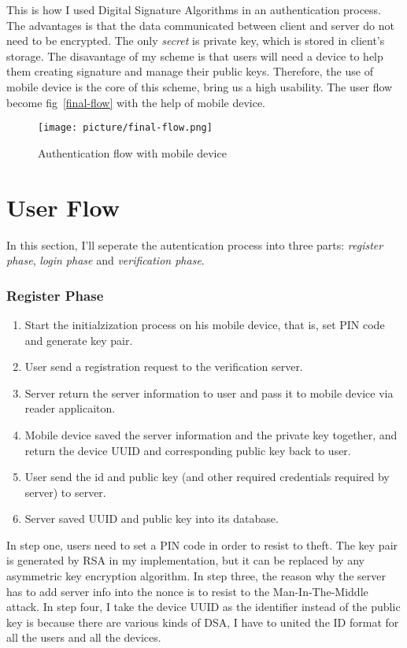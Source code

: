 \begin{CJK}{Bg5}{bsmi}
This is how I used Digital Signature Algorithms in an authentication process. The advantages is that the data communicated between client and server do not need to be encrypted. The only \emph{secret} is private key, which is stored in client's storage. The disavantage of my scheme is that users will need a device to help them creating signature and manage their public keys. Therefore, the use of mobile device is the core of this scheme, bring us a high usability. The user flow become fig~\ref{final-flow} with the help of mobile device.

\begin{figure}
\centering
\label{fig:final-flow}
\texttt{[image: picture/final-flow.png]}
\caption{Authentication flow with mobile device}
\end{figure}

\section{User Flow}

In this section, I'll seperate the autentication process into three parts: \emph{register phase}, \emph{login phase} and \emph{verification phase}.

\subsubsection{Register Phase}

\begin{enumerate}
\item Start the initialzization process on his mobile device, that is, set PIN code and generate key pair.
\item User send a registration request to the verification server.
\item Server return the server information to user and pass it to mobile device via reader applicaiton.
\item Mobile device saved the server information and the private key together, and return the device UUID and corresponding public key back to user.
\item User send the id and public key (and other required credentials required by server) to server.
\item Server saved UUID and public key into its database.
\end{enumerate}

In step one, users need to set a PIN code in order to resist to theft. The key pair is generated by RSA in my implementation, but it can be replaced by any asymmetric key encryption algorithm. In step three, the reason why the server has to add server info into the nonce is to resist to the Man-In-The-Middle attack. In step four, I take the device UUID as the identifier instead of the public key is because there are various kinds of DSA, I have to united the ID format for all the users and all the devices.


\end{CJK}
